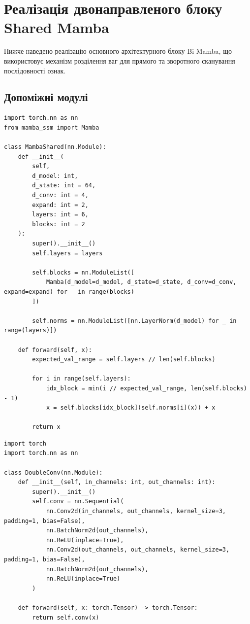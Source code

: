 \section{Реалізація двонаправленого блоку Shared Mamba}

Нижче наведено реалізацію основного архітектурного блоку Bi-Mamba, що використовує механізм розділення ваг для прямого та зворотного сканування послідовності ознак.
\subsection{Допоміжні модулі}

\begin{lstlisting}[caption={Клас модуля Shared Mamba (PyTorch)}]
import torch.nn as nn
from mamba_ssm import Mamba

class MambaShared(nn.Module):
    def __init__(
        self,
        d_model: int,
        d_state: int = 64,
        d_conv: int = 4,
        expand: int = 2,
        layers: int = 6,
        blocks: int = 2
    ):
        super().__init__()
        self.layers = layers

        self.blocks = nn.ModuleList([
            Mamba(d_model=d_model, d_state=d_state, d_conv=d_conv, expand=expand) for _ in range(blocks)
        ])

        self.norms = nn.ModuleList([nn.LayerNorm(d_model) for _ in range(layers)])

    def forward(self, x):
        expected_val_range = self.layers // len(self.blocks)

        for i in range(self.layers):
            idx_block = min(i // expected_val_range, len(self.blocks) - 1)
            x = self.blocks[idx_block](self.norms[i](x)) + x

        return x
\end{lstlisting}

\begin{lstlisting}[caption={Клас модуля DoubleConv (PyTorch)}]
import torch
import torch.nn as nn

class DoubleConv(nn.Module):
    def __init__(self, in_channels: int, out_channels: int):
        super().__init__()
        self.conv = nn.Sequential(
            nn.Conv2d(in_channels, out_channels, kernel_size=3, padding=1, bias=False),
            nn.BatchNorm2d(out_channels),
            nn.ReLU(inplace=True),
            nn.Conv2d(out_channels, out_channels, kernel_size=3, padding=1, bias=False),
            nn.BatchNorm2d(out_channels),
            nn.ReLU(inplace=True)
        )

    def forward(self, x: torch.Tensor) -> torch.Tensor:
        return self.conv(x)
\end{lstlisting}

